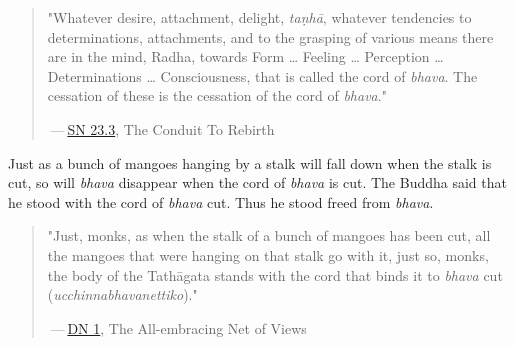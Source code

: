 \begin{quotation}
"Whatever desire, attachment, delight, \emph{taṇhā},
whatever tendencies to determinations, attachments, and to the grasping
of various means there are in the mind, Radha, towards Form … Feeling …
Perception … Determinations … Consciousness, that is called the cord of
\emph{bhava}. The cessation of these is the cessation of the cord of \emph{bhava}."


 — \href{https://suttacentral.net/sn23.3/en/sujato}{SN 23.3}, The Conduit To Rebirth


\end{quotation}

Just as a bunch of mangoes hanging by a stalk will fall down when the
stalk is cut, so will \emph{bhava} disappear when the cord of \emph{bhava} is cut.
The Buddha said that he stood with the cord of \emph{bhava} cut. Thus he
stood freed from \emph{bhava}.


\begin{quotation}
"Just, monks, as when the stalk of a bunch
of mangoes has been cut, all the mangoes that were hanging on that stalk
go with it, just so, monks, the body of the Tathāgata stands with the
cord that binds it to \emph{bhava} cut (\emph{ucchinnabhavanettiko})."


 — \href{https://suttacentral.net/dn1/en/bodhi}{DN 1}, The All-embracing Net of Views


\end{quotation}

